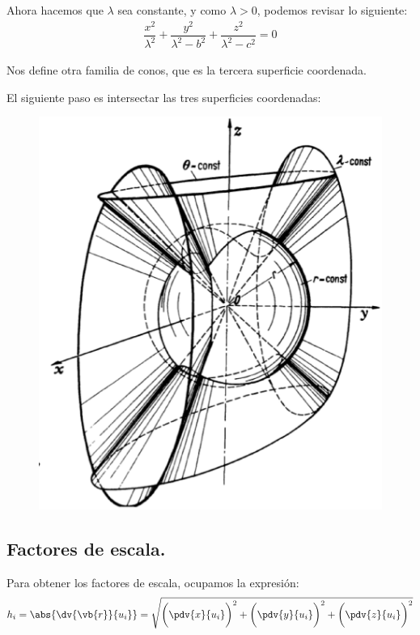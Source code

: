 Ahora hacemos que $\lambda$ sea constante, y como $\lambda > 0$, podemos revisar lo siguiente:
\begin{align*}
\dfrac{x^{2}}{\lambda^{2}} + \dfrac{y^{2}}{\lambda^{2} - b^{2}} + \dfrac{z^{2}}{\lambda^{2} - c^{2}} = 0
\end{align*}

Nos define otra familia de conos, que es la tercera superficie coordenada.

El siguiente paso es intersectar las tres superficies coordenadas:
\begin{figure}[H]
  \centering
  \includegraphics[scale=0.5]{Imagenes/Sistema_Conico.eps}
\end{figure}

\subsection{Factores de escala.}

Para obtener los factores de escala, ocupamos la expresión:
\begin{align*}
h_{i} =  \abs{\dv{\vb{r}}{u_{i}}} =  \sqrt{\bigg( \pdv{x}{u_{i}} \bigg)^{2} + \bigg( \pdv{y}{u_{i}} \bigg)^{2} + \bigg( \pdv{z}{u_{i}} \bigg)^{2}}
\end{align*}

